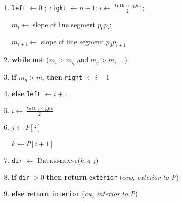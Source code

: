 \documentclass [12pt]{article}
\begin{document}
\begin{enumerate}[label=(\alph*)]
\begin{enumerate}[label=\arabic*.]
                \item \texttt{left} $\leftarrow 0$ ; \texttt{right} $\leftarrow n - 1$; $i \leftarrow \frac{\texttt{left} + \texttt{right}}{2}$; 
                
                    $m_i \leftarrow$ slope of line segment $\overline{p_0 p_{i}}$; 
                    
                    $m_{i+1} \leftarrow$ slope of line segment $\overline{p_0 p_{i+1}}$
                
                \item \textbf{while not} ($m_{i} > m_{q}$ and $m_{q} > m_{i+1}$)
                \item \hspace{1cm} \textbf{if} $m_q > m_i$ \textbf{then} \texttt{right} $\leftarrow i - 1$
                \item \hspace{1cm} \textbf{else} \texttt{left} $\leftarrow i + 1$
                \item \hspace{1cm} $i \leftarrow \frac{\texttt{left} + \texttt{right}}{2}$
                \item $j\leftarrow P[i]$
                
                 $k\leftarrow P[i+1]$

                \item \texttt{dir} $\leftarrow$ \textsc{Determinant}($k, q, j$)
                \item \textbf{if} \texttt{dir} $> 0$ \textbf{then return} \texttt{exterior} \hspace{1cm} (\emph{ccw, exterior to P})
                \item \textbf{else return} \texttt{interior} \hspace{1cm} (\emph{cw, interior to P})
                

                

\end{enumerate}
\end{enumerate}
\end{document}
